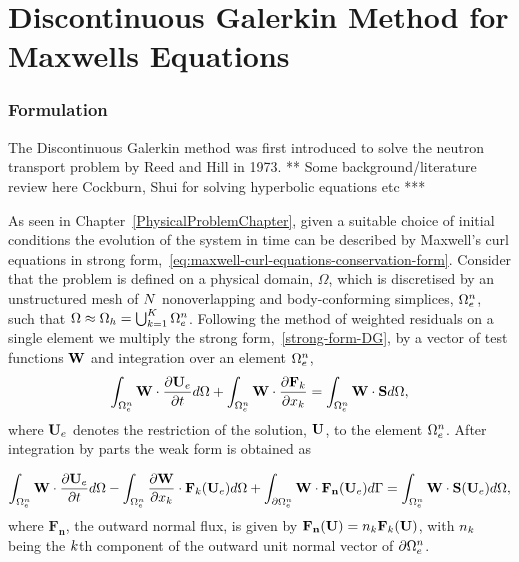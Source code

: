 \chapter{Discontinuous Galerkin Method for Maxwells Equations} %
\label{Chapter3}

\subsection{Formulation}

The Discontinuous Galerkin method was first introduced to solve the neutron transport problem by Reed and Hill \cite{} in 1973.
** Some background/literature review here Cockburn, Shui for solving hyperbolic equations etc ***

As seen in Chapter~\ref{PhysicalProblemChapter}, given a suitable choice of initial conditions the evolution of the system in time can be described by Maxwell's curl equations in strong form,~\eqref{eq:maxwell-curl-equations-conservation-form}. Consider that the problem is defined on a physical domain, $\Omega$, which is discretised by an unstructured mesh of $\elemtot$ nonoverlapping and body-conforming simplices, $\Omega_e^{n}$, such that $ \Omega \approx \Omega_h = \mathop{\bigcup}_{k=1}^{K} \Omega_e^{n} $.
Following the method of weighted residuals on a single element we multiply the strong form,~\eqref{strong-form-DG}, by a vector of test functions $\mathbf{W}$ and integration over an element $\Omega_e^{n}$,
$$
\int_{\Omega_e^{n}} \mathbf{W} \cdot \frac{\partial \mathbf{U}_e}{\partial t} d\Omega  + \int_{\Omega_e^{n}} \mathbf{W} \cdot \frac{\partial \mathbf{F}_{k}}{\partial x_{k}}= \int_{\Omega_e^{n}} \mathbf{W} \cdot \mathbf{S} d\Omega,
$$
where $\mathbf{U}_e$ denotes the restriction of the solution, $\mathbf{U}$, to the element $\Omega_e^{n}$. After integration by parts the weak form is obtained as

\begin{equation}
\int_{\Omega_e^{n}} \mathbf{W} \cdot \frac{\partial \mathbf{U}_e}{\partial t} d\Omega  - \int_{\Omega_e^{n}} \frac{\partial \mathbf{W}}{\partial x_{k}} \cdot
\mathbf{F}_{k}(\mathbf{U}_e) d\Omega + \int_{\partial \Omega_e^{n}} \mathbf{W} \cdot \mathbf{\mathbf{F}_n}(\mathbf{U}_e) d\Gamma
= \int_{\Omega_e^{n}} \mathbf{W} \cdot \mathbf{S}(\mathbf{U}_e) d\Omega,
\label{eq:weak-form-with-physical-flux}
\end{equation}
where $\mathbf{F_n}$, the outward normal flux, is given by $ \mathbf{F_n}(\mathbf{U}) = n_{k} \mathbf{F}_k(\mathbf{U}) $, with $n_{k}$ being the $k$th component of the outward unit normal vector of $\partial \Omega_e^{n}$.

